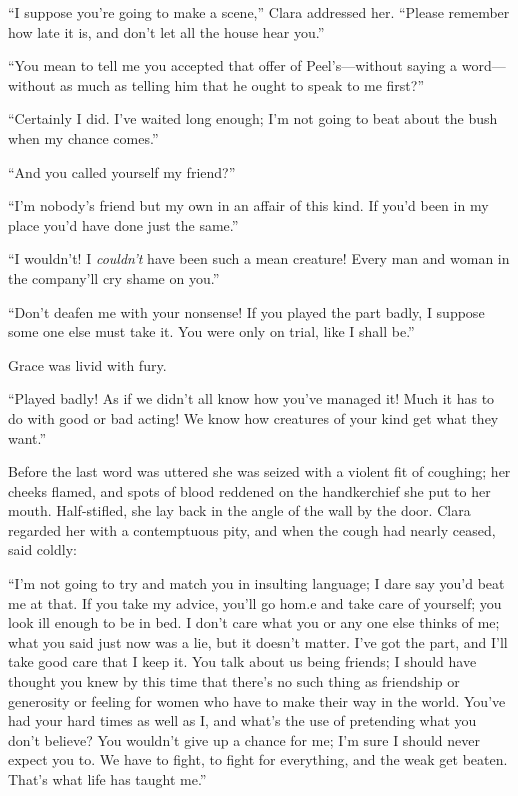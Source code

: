 ``I suppose you're going to make a scene,'' Clara addressed her.
``Please remember how late it is, and don't let all the house hear
you.''

``You mean to tell me you accepted that {}offer of Peel's---without
saying a word---without as much as telling him that he ought to speak to
me first?''

``Certainly I did. I've waited long enough; I'm not going to beat about
the bush when my chance comes.''

``And you called yourself my friend?''

``I'm nobody's friend but my own in an affair of this kind. If you'd
been in my place you'd have done just the same.''

``I wouldn't! I \emph{couldn't} have been such a mean creature! Every
man and woman in the company'll cry shame on you.''

``Don't deafen me with your nonsense! If you played the part badly, I
suppose some one else must take it. You were only on trial, like I shall
be.''

Grace was livid with fury.

``Played badly! As if we didn't all know how you've managed it! Much it
has to do with good or bad acting! We know how creatures of your kind
get what they want.''

Before the last word was uttered she was seized with a violent fit of
coughing; her {}cheeks flamed, and spots of blood reddened on the
handkerchief she put to her mouth. Half-stifled, she lay back in the
angle of the wall by the door. Clara regarded her with a contemptuous
pity, and when the cough had nearly ceased, said coldly:

``I'm not going to try and match you in insulting language; I dare say
you'd beat me at that. If you take my advice, you'll go hom.e and take
care of yourself; you look ill enough to be in bed. I don't care what
you or any one else thinks of me; what you said just now was a lie, but
it doesn't matter. I've got the part, and I'll take good care that I
keep it. You talk about us being friends; I should have thought you knew
by this time that there's no such thing as friendship or generosity or
feeling for women who have to make their way in the world. You've had
your hard times as well as I, and what's the use of pretending what you
don't believe? You wouldn't give up a chance for me; I'm sure I should
never expect you to. We have to fight, to fight for everything, and the
weak {}get beaten. That's what life has taught me.''

